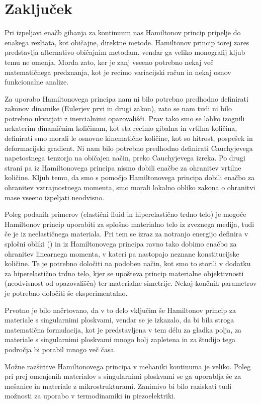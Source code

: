 \chapter*{Zaključek}


Pri izpeljavi enačb gibanja za kontinuum nas Hamiltonov princip pripelje do enakega rezltata,
kot običajne, direktne metode. Hamiltonov princip torej zares predstavlja alternativo običajnim
metodam, vendar ga veliko monografij kljub temu ne omenja. Morda zato, ker je zanj
vseeno potrebno nekaj več matematičnega predznanja, kot je recimo variacijski račun
in nekaj osnov funkcionalne analize.

Za uporabo Hamiltonovega principa nam ni bilo potrebno predhodno definirati
zakonov dinamike (Eulerjev prvi in drugi zakon), zato se nam tudi ni bilo
potrebno ukvarjati z inercialnimi opazovališči. Prav tako smo se lahko
izognili nekaterim dinamičnim količinam, kot sta recimo gibalna in vrtilna količina,
definirati smo morali le osnovne
kinematične količine, kot so hitrost, pospešek in deformacijski gradient.
Ni nam bilo potrebno predhodno definirati Cauchyjevega napetostnega tenzorja
na običajen način, preko Cauchyjevega izreka. Po drugi strani pa iz Hamiltonovega
principa nismo dobili enačbe za ohranitev vrtilne količine.
Kljub temu, da smo s pomočjo Hamiltonovega principa dobili enačbo za ohranitev vztrajnostnega momenta,
smo morali lokalno obliko zakona o ohranitvi mase vseeno izpeljati neodvisno.

Poleg podanih primerov (elastični fluid in hiperelastično trdno telo) je
mogoče Hamiltonov princip uporabiti za splošno materialno telo iz
zveznega medija, tudi če je iz neelastičnega materiala. Pri tem se
izraz za notranjo energijo definira v splošni obliki (\cite[str.~45]{bedford}) in iz Hamiltonovega
principa ravno tako dobimo enačbo za ohranitev linearnega momenta, v
kateri pa nastopajo neznane konstitucijske količine. Te je potrebno določiti
na podoben način, kot smo to storili v dodatku za hiperelastično trdno telo,
kjer se upošteva princip materialne objektivnosti (neodvisnost od opazovališča)
ter materialne simetrije. Nekaj končnih parametrov je potrebno določiti
še eksperimentalno.

Prvotno je bilo načrtovano, da v to delo vključim še Hamiltonov princip
za materiale s singularnimi ploskvami, vendar se je izkazalo, da bi bila
stroga matematična formulacija, kot je predstavljena v tem délu za gladka polja,
za materiale s singularnimi ploskvami mnogo bolj zapletena in za študijo
tega področja bi porabil mnogo več časa.

Možne razširitve Hamiltonovega principa v mehaniki kontinuma je veliko.
Poleg pri prej omenjenih materialov s singularnimi ploskvami se ga uporablja
še za mešanice in materiale z mikrostrukturami. Zanimivo bi bilo raziskati
tudi možnosti za uporabo v termodinamiki in piezoelektriki.